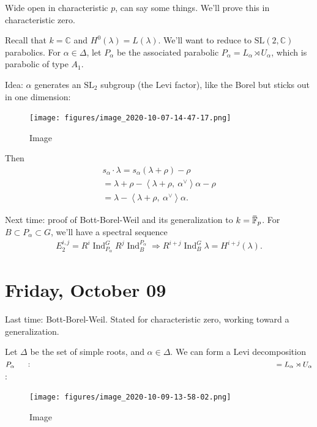 Wide open in characteristic \(p\), can say some things. We'll prove this
in characteristic zero.

Recall that \(k={\mathbb{C}}\) and \(H^0(\lambda) = L(\lambda)\). We'll
want to reduce to \({\text{SL}}(2, {\mathbb{C}})\) parabolics. For
\(\alpha\in\Delta\), let \(P_\alpha\) be the associated parabolic
\(P_\alpha = L_\alpha \rtimes U_\alpha\), which is parabolic of type
\(A_1\).

Idea: \(\alpha\) generates an \({\text{SL}}_2\) subgroup (the Levi
factor), like the Borel but sticks out in one dimension:

\begin{figure}
\centering
\texttt{[image: figures/image\_2020-10-07-14-47-17.png]}
\caption{Image}
\end{figure}

Then
\begin{align*}  s_\alpha \cdot \lambda = s_\alpha(\lambda + \rho) - \rho \\ = \lambda + \rho - {\left\langle {\lambda + \rho},~{\alpha^\vee} \right\rangle}\alpha - \rho \\ = \lambda - {\left\langle {\lambda + \rho},~{\alpha^\vee} \right\rangle}\alpha .\end{align*}

Next time: proof of Bott-Borel-Weil and its generalization to
\(k = \mkern 1.5mu\overline{\mkern-1.5mu{\mathbb{F}}\mkern-1.5mu}\mkern 1.5mu_p\).
For \(B\subset P_\alpha \subset G\), we'll have a spectral sequence
\begin{align*}   E_2^{i, j} = R^i \operatorname{Ind}_{P_\alpha}^G R^j \operatorname{Ind}_B^{P_\alpha}  \Rightarrow R^{i+j} \operatorname{Ind}_B^G  \lambda = H^{i+j}(\lambda) .\end{align*}

\hypertarget{friday-october-09}{%
\section{Friday, October 09}\label{friday-october-09}}

Last time: Bott-Borel-Weil. Stated for characteristic zero, working
toward a generalization.

Let \(\Delta\) be the set of simple roots, and \(\alpha\in \Delta\). We
can form a Levi decomposition
\(P_\alpha \mathrel{\vcenter{:}}= L_\alpha \rtimes U_\alpha\):

\begin{figure}
\centering
\texttt{[image: figures/image\_2020-10-09-13-58-02.png]}
\caption{Image}
\end{figure}

